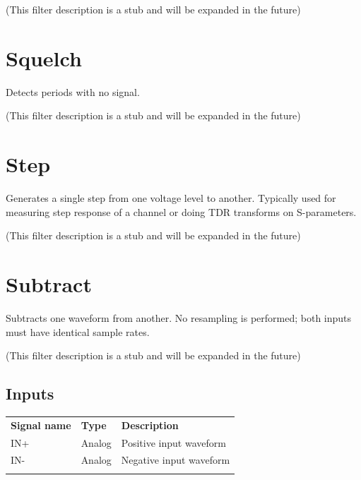 (This filter description is a stub and will be expanded in the future)

\pagebreak
\section{Squelch}

Detects periods with no signal.

(This filter description is a stub and will be expanded in the future)

\pagebreak
\section{Step}

Generates a single step from one voltage level to another. Typically used for measuring step response of a channel or
doing TDR transforms on S-parameters.

(This filter description is a stub and will be expanded in the future)

\pagebreak
\section{Subtract}

Subtracts one waveform from another. No resampling is performed; both inputs must have identical sample rates.

(This filter description is a stub and will be expanded in the future)

\subsection{Inputs}

\begin{tabularx}{16cm}{llX}
\thickhline
\textbf{Signal name} & \textbf{Type} & \textbf{Description} \\
\thickhline
IN+ & Analog & Positive input waveform \\
\thinhline
IN- & Analog & Negative input waveform \\
\thickhline
\end{tabularx}

